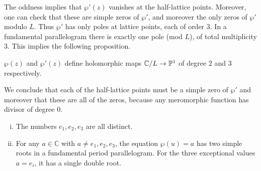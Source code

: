 \documentclass[12pt]{article}
\begin{document}
The oddness implies that $\wp'(z)$ vanishes at the half-lattice points. Moreover, one can check that these are simple zeros of $\wp'$, and moreover the only zeros of $\wp'$ modulo $L$. Thus $\wp'$ has only poles at lattice points, each of order 3. In a fundamental parallelogram there is exactly one pole (mod $L$), of total multiplicity 3. This implies the following proposition.
\begin{proposition}
    $\wp(z)$ and $\wp'(z)$ define holomorphic maps $\mathbb{C}/L \to \mathbb{P}^1$ of degree $2$ and $3$ respectively.
\end{proposition}
We conclude that each of the half-lattice points must be a simple zero of $\wp'$ and moreover that these are all of the zeros, because any meromorphic function has divisor of degree 0.

\begin{proposition}\label{prop:wp-map}
\leavevmode
\begin{enumerate}[(i)]
    \item The numbers $e_1,e_2,e_3$ are all distinct.
    \item For any $a \in \mathbb{C}$ with $a \neq e_1,e_2,e_3$, the equation $\wp(u)=a$ has two simple roots in a fundamental period parallelogram. For the three exceptional values $a=e_i$, it has a single double root.
\end{enumerate}
\end{proposition}
\end{document}
